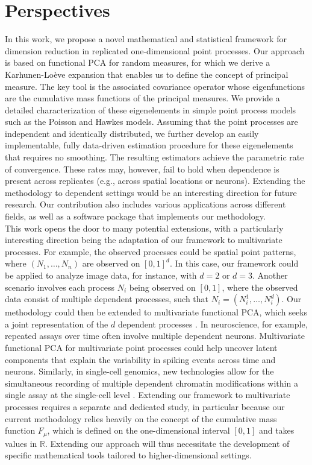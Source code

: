 \documentclass[aos]{imsart}
\theoremstyle{plain}
\theoremstyle{remark}
\newcommand{\1}{1}
\begin{document}
\section{Perspectives}
In this work, we propose a novel mathematical and statistical framework for dimension reduction in replicated one-dimensional point processes. Our approach is based on functional PCA for random measures, for which we derive a Karhunen-Loève expansion that enables us to define the concept of  principal measure. The key tool is the associated covariance operator whose eigenfunctions are the cumulative mass functions of the principal measures. We provide a detailed characterization of these eigenelements in simple point process models such as the Poisson and Hawkes models. Assuming that the point processes are independent and identically distributed, we further develop an easily implementable, fully data-driven estimation procedure for these eigenelements that requires no smoothing. The resulting estimators achieve the parametric rate of convergence. These rates may, however, fail to hold when dependence is present across replicates (e.g., across spatial locations or neurons). Extending the methodology to dependent settings would be an interesting direction for future research. Our contribution also includes various applications across different fields, as well as a software package that implements our methodology.  \\
This work opens the door to many potential extensions, with a particularly interesting direction being the adaptation of our framework to multivariate processes. For example, the observed processes could be spatial point patterns, where \((N_1, \hdots, N_n)\) are observed on \([0,1]^d\). In this case, our framework could be applied to analyze image data, for instance, with \(d = 2\) or \(d = 3\). Another scenario involves each process \(N_i\) being observed on \([0,1]\), where the observed data consist of multiple dependent processes, such that \(N_i = (N_i^1, \hdots, N_i^d)\). Our methodology could then be extended to multivariate functional PCA, which seeks a joint representation of the \(d\) dependent processes \cite{Happ:Greven}. In neuroscience, for example, repeated assays over time often involve multiple dependent neurons. Multivariate functional PCA for multivariate point processes could help uncover latent components that explain the variability in spiking events across time and neurons. Similarly, in single-cell genomics, new technologies allow for the simultaneous recording of multiple dependent chromatin modifications within a single assay at the single-cell level \cite{Meers2023}. Extending our framework to multivariate processes requires a separate and dedicated study, in particular because our current methodology relies heavily on the concept of the cumulative mass function \(F_{\mu}\), which is defined on the one-dimensional interval \([0,1]\) and takes values in \(\mathbb{R}\). Extending our approach will thus necessitate the development of specific mathematical tools tailored to higher-dimensional settings.
 
\end{document}

